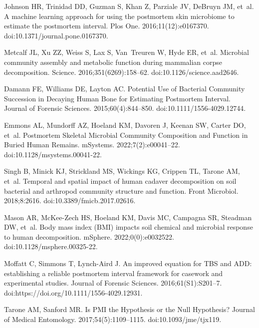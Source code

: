 \documentclass[
  10pt,
  letterpaper,
]{article}
\begin{document}
\begin{thebibliography}{10}
  Johnson HR, Trinidad DD, Guzman S, Khan Z, Parziale JV, DeBruyn JM, et~al.
  \newblock A machine learning approach for using the postmortem skin microbiome
    to estimate the postmortem interval.
  \newblock Plos One. 2016;11(12):e0167370.
  \newblock doi:{10.1371/journal.pone.0167370}.
  
  Metcalf JL, Xu ZZ, Weiss S, Lax S, Van~Treuren W, Hyde ER, et~al.
  \newblock Microbial community assembly and metabolic function during mammalian
    corpse decomposition.
  \newblock Science. 2016;351(6269):158--62.
  \newblock doi:{10.1126/science.aad2646}.
  
  Damann FE, Williams DE, Layton AC.
  \newblock Potential {Use} of {Bacterial} {Community} {Succession} in {Decaying}
    {Human} {Bone} for {Estimating} {Postmortem} {Interval}.
  \newblock Journal of Forensic Sciences. 2015;60(4):844--850.
  \newblock doi:{10.1111/1556-4029.12744}.
  
  Emmons AL, Mundorff AZ, Hoeland KM, Davoren J, Keenan SW, Carter DO, et~al.
  \newblock Postmortem {Skeletal} {Microbial} {Community} {Composition} and
    {Function} in {Buried} {Human} {Remains}.
  \newblock mSystems. 2022;7(2):e00041--22.
  \newblock doi:{10.1128/msystems.00041-22}.
  
  Singh B, Minick KJ, Strickland MS, Wickings KG, Crippen TL, Tarone AM, et~al.
  \newblock Temporal and spatial impact of human cadaver decomposition on soil
    bacterial and arthropod community structure and function.
  \newblock Front Microbiol. 2018;8:2616.
  \newblock doi:{10.3389/fmicb.2017.02616}.
  
  Mason AR, McKee-Zech HS, Hoeland KM, Davis MC, Campagna SR, Steadman DW, et~al.
  \newblock Body mass index ({BMI}) impacts soil chemical and microbial response
    to human decomposition.
  \newblock mSphere. 2022;0(0):e0032522.
  \newblock doi:{10.1128/msphere.00325-22}.
  
  Moffatt C, Simmons T, Lynch-Aird J.
  \newblock An improved equation for {TBS} and {ADD}: establishing a reliable
    postmortem interval framework for casework and experimental studies.
  \newblock Journal of Forensic Sciences. 2016;61(S1):S201--7.
  \newblock doi:{https://doi.org/10.1111/1556-4029.12931}.
  
  Tarone AM, Sanford MR.
  \newblock Is {PMI} the {Hypothesis} or the {Null} {Hypothesis}?
  \newblock Journal of Medical Entomology. 2017;54(5):1109--1115.
  \newblock doi:{10.1093/jme/tjx119}.
  

\end{thebibliography}
\end{document}
